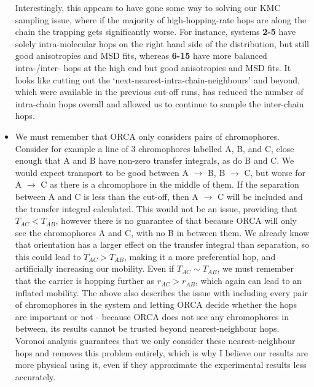 \documentclass[12pt]{article}
\begin{document}
\begin{itemize}
{        Interestingly, this appears to have gone some way to solving our KMC sampling issue, where if the majority of high-hopping-rate hops are along the chain the trapping gets significantly worse.
        For instance, systems \textbf{2-5} have solely intra-molecular hops on the right hand side of the distribution, but still good anisotropies and MSD fits, whereas \textbf{6-15} have more balanced intra-/inter- hops at the high end but good anisotropies and MSD fits.
        It looks like cutting out the `next-nearest-intra-chain-neighbours' and beyond, which were available in the previous cut-off runs, has reduced the number of intra-chain hops overall and allowed us to continue to sample the inter-chain hops.
    }
\item{We must remember that ORCA only considers pairs of chromophores.
        Consider for example a line of 3 chromophores labelled A, B, and C, close enough that A and B have non-zero transfer integrals, as do B and C.
        We would expect transport to be good between A $\rightarrow$ B, B $\rightarrow$ C, but worse for A $\rightarrow$ C as there is a chromophore in the middle of them.
        If the separation between A and C is less than the cut-off, then A $\rightarrow$ C will be included and the transfer integral calculated.
        This would not be an issue, providing that $T_{AC} < T_{AB}$, however there is no guarantee of that because ORCA will only see the chromophores A and C, with no B in between them.
        We already know that orientation has a larger effect on the transfer integral than separation, so this could lead to $T_{AC} > T_{AB}$, making it a more preferential hop, and artificially increasing our mobility.
        Even if $T_{AC} \sim T_{AB}$, we must remember that the carrier is hopping further as $r_{AC} > r_{AB}$, which again can lead to an inflated mobility.
        The above also describes the issue with including every pair of chromophores in the system and letting ORCA decide whether the hops are important or not - because ORCA does not see any chromophores in between, its results cannot be trusted beyond nearest-neighbour hops.
        Voronoi analysis guarantees that we only consider these nearest-neighbour hops and removes this problem entirely, which is why I believe our results are more physical using it, even if they approximate the experimental results less accurately.
    }
\end{itemize}
\end{document}
